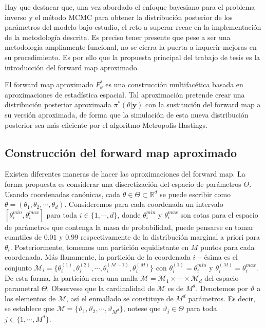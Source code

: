 Hay que destacar que, una vez abordado el enfoque bayesiano para el problema inverso y el método MCMC para obtener la distribución posterior de los parámetros del modelo bajo estudio, el reto a superar recae en la implementación de la metodología descrita. Es preciso tener presente que pese a ser una metodología ampliamente funcional, no se cierra la puerta a inquerir mejoras en su procedimiento. Es por ello que la propuesta principal del trabajo de tesis es la introducción del forward map aproximado.

El forward map aproximado $F_{\theta}^{*}$ es una construcción multifacética basada en aproximaciones de estadística espacial. Tal aproximación pretende crear una distribución posterior aproximada $\pi^{*}(\theta|\mathbf{y})$ con la sustitución del forward map a su versión aproximada, de forma que la simulación de esta nueva distribución posterior sea más eficiente por el algoritmo Metropolis-Hastings. 

\subsection*{Construcción del forward map aproximado}
Existen diferentes maneras de hacer las aproximaciones del forward map. La forma propuesta es considerar una discretización del espacio de parámetros $\Theta$. Usando coordenadas canónicas, cada $\theta \in \Theta \subset \mathbb{R}^d$ se puede escribir como $\theta = (\theta_1, \theta_2, \cdots, \theta_d)$. Consideremos para cada coordenada un intervalo $[\theta_i^{min},\theta_i^{max}]$ para toda $i \in \{1,\cdots,d\}$, donde $\theta_i^{min}$ y $\theta_i^{max}$ son cotas para el espacio de parámetros que contenga la masa de probabilidad, puede pensarse en tomar cuantiles de $0.01$ y $0.99$ respectivamente de la distribución marginal a priori para $\theta_i$. Posteriormente, tomemos una partición equidistante en $M$ puntos para cada coordenada. Más llanamente, la partición de la coordenada $i-$ésima es el conjunto $\mathcal{M}_i =\{ \theta_i^{(1)}, \theta_i^{(2)},\cdots , \theta_i^{(M-1)}, \theta_i^{(M)}\}$ con $\theta_i^{(1)} = \theta_i^{min}$ y $\theta_i^{(M)} = \theta_i^{max}$. De esta forma, la partición crea una malla $\mathcal{M} = \mathcal{M}_1 \times \cdots \times \mathcal{M}_d$ del espacio parametral $\Theta$. Observese que la cardinalidad de $\mathcal{M}$ es de $M^d$. Denotemos por $\vartheta$ a los elementos de $\mathcal{M}$, así el enmallado se constituye de $M^d$ parámetros. Es decir, se establece que $\mathcal{M} = \{\vartheta_1, \vartheta_2, \cdots, \vartheta_{M^d}\}$, notese que $\vartheta_j \in \Theta$ para toda $j \in \{1,\cdots, M^d \}$.

